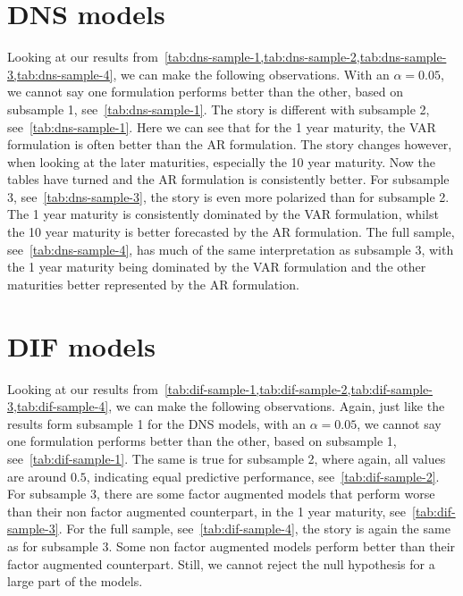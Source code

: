 \section{DNS models}
Looking at our results from~\cref{tab:dns-sample-1,tab:dns-sample-2,tab:dns-sample-3,tab:dns-sample-4}, we can make the following observations. 
With an $\alpha = 0.05$, we cannot say one formulation performs better than the other, based on subsample 1, see~\cref{tab:dns-sample-1}. 
The story is different with subsample 2, see~\cref{tab:dns-sample-1}. 
Here we can see that for the 1 year maturity, the VAR formulation is often better than the AR formulation.
The story changes however, when looking at the later maturities, especially the 10 year maturity.
Now the tables have turned and the AR formulation is consistently better.
For subsample 3, see~\cref{tab:dns-sample-3}, the story is even more polarized than for subsample 2. 
The 1 year maturity is consistently dominated by the VAR formulation, whilst the 10 year maturity is better forecasted by the AR formulation. 
The full sample, see~\cref{tab:dns-sample-4}, has much of the same interpretation as subsample 3, with the 1 year maturity being dominated by the VAR formulation and the other maturities better represented by the AR formulation.

\section{DIF models}
Looking at our results from~\cref{tab:dif-sample-1,tab:dif-sample-2,tab:dif-sample-3,tab:dif-sample-4}, we can make the following observations. 
Again, just like the results form subsample 1 for the DNS models, with an $\alpha = 0.05$, we cannot say one formulation performs better than the other, based on subsample 1, see~\cref{tab:dif-sample-1}. 
The same is true for subsample 2, where again, all values are around $0.5$, indicating equal predictive performance, see~\cref{tab:dif-sample-2}.
For subsample 3, there are some factor augmented models that perform worse than their non factor augmented counterpart, in the 1 year maturity, see~\cref{tab:dif-sample-3}. 
For the full sample, see~\cref{tab:dif-sample-4}, the story is again the same as for subsample 3.
Some non factor augmented models perform better than their factor augmented counterpart. 
Still, we cannot reject the null hypothesis for a large part of the models.

